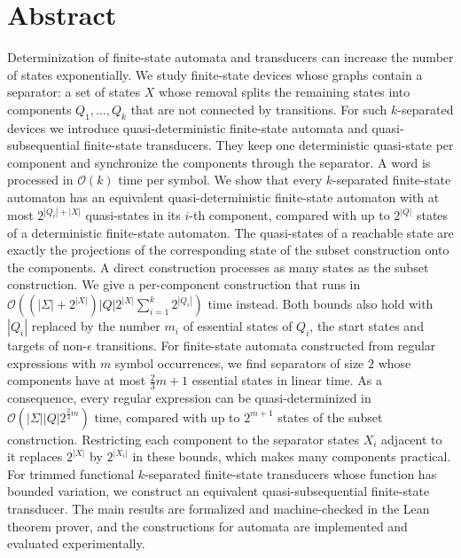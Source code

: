 \chapter*{Abstract}

Determinization of finite-state automata and transducers can increase the number of
states exponentially. We study finite-state devices whose graphs contain a separator: a
set of states $X$ whose removal splits the remaining states into components $Q_1,
\ldots, Q_k$ that are not connected by transitions. For such $k$-separated devices we
introduce quasi-deterministic finite-state automata and quasi-subsequential
finite-state transducers. They keep one deterministic quasi-state per component and
synchronize the components through the separator. A word is processed in $\mathcal{O}(k)$
time per symbol.
\bigbreak
We show that every $k$-separated finite-state automaton has an equivalent
quasi-deterministic finite-state automaton with at most $2^{|Q_i| + |X|}$ quasi-states in
its $i$-th component, compared with up to $2^{|Q|}$ states of a deterministic
finite-state automaton. The quasi-states of a reachable state are exactly the projections
of the corresponding state of the subset construction onto the components. A direct
construction processes as many states as the subset construction. We give a
per-component construction that runs in $\mathcal{O}((|\Sigma| + 2^{|X|}) |Q| 2^{|X|}
\sum_{i=1}^k 2^{|Q_i|})$ time instead. Both bounds also hold with $|Q_i|$ replaced by the
number $m_i$ of essential states of $Q_i$, the start states and targets of non-$\epsilon$
transitions. For finite-state automata constructed from regular expressions with $m$
symbol occurrences, we find separators of size $2$ whose components have at most
$\frac{2}{3}m + 1$ essential states in linear time. As a consequence, every regular
expression can be quasi-determinized in $\mathcal{O}(|\Sigma| |Q| 2^{\frac{2}{3}m})$
time, compared with up to $2^{m+1}$ states of the subset construction. Restricting each
component to the separator states $X_i$ adjacent to it replaces $2^{|X|}$ by $2^{|X_i|}$ in
these bounds, which makes many components practical. For trimmed
functional $k$-separated finite-state transducers whose function has bounded variation,
we construct an equivalent quasi-subsequential finite-state transducer.
\bigbreak
The main results are formalized and machine-checked in the Lean theorem prover, and the
constructions for automata are implemented and evaluated experimentally.
